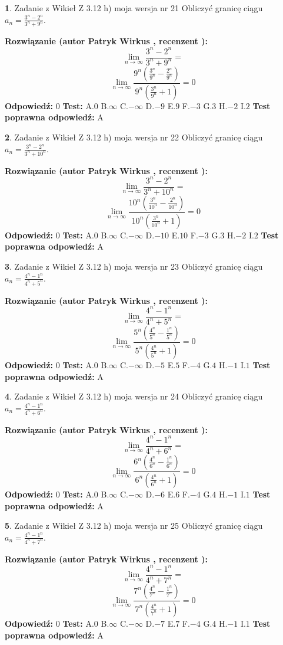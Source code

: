 \documentclass[12pt, a4paper]{article}
\theoremstyle{definition} %
\newtheorem{zad}{}
\newcommand{\zadStart}[1]{\begin{zad}#1\newline}
\newcommand{\zadStop}{\end{zad}}
\newcommand{\rozwStart}[2]{\noindent \textbf{Rozwiązanie (autor #1 , recenzent #2): }\newline}
\newcommand{\rozwStop}{\newline}
\newcommand{\odpStart}{\noindent \textbf{Odpowiedź:}\newline}
\newcommand{\odpStop}{\newline}
\newcommand{\testStart}{\noindent \textbf{Test:}\newline}
\newcommand{\testStop}{\newline}
\newcommand{\kluczStart}{\noindent \textbf{Test poprawna odpowiedź:}\newline}
\newcommand{\kluczStop}{\newline}
\begin{document}
\zadStart{Zadanie z Wikieł Z 3.12 h) moja wersja nr 21}
Obliczyć granicę ciągu $a_{n}=\frac{3^{n} - 2^{n}}{3^{n} + 9^{n}}$.
\zadStop
\rozwStart{Patryk Wirkus}{}
$$\lim\limits_{n\to\infty}\frac{3^{n} - 2^{n}}{3^{n} + 9^{n}}=$$
$$\lim\limits_{n\to\infty}\frac{9^{n}(\frac{3^{n}}{9^{n}} - \frac{2^{n}}{9^{n}})}{9^{n}(\frac{3^{n}}{9^{n}} + 1)} = 0$$
\rozwStop
\odpStart
$0$
\odpStop
\testStart
A.$0$
B.$\infty$
C.$-\infty$
D.$-9$
E.$9$
F.$-3$
G.$3$
H.$-2$
I.$2$
\testStop
\kluczStart
A
\kluczStop



\zadStart{Zadanie z Wikieł Z 3.12 h) moja wersja nr 22}
Obliczyć granicę ciągu $a_{n}=\frac{3^{n} - 2^{n}}{3^{n} + 10^{n}}$.
\zadStop
\rozwStart{Patryk Wirkus}{}
$$\lim\limits_{n\to\infty}\frac{3^{n} - 2^{n}}{3^{n} + 10^{n}}=$$
$$\lim\limits_{n\to\infty}\frac{10^{n}(\frac{3^{n}}{10^{n}} - \frac{2^{n}}{10^{n}})}{10^{n}(\frac{3^{n}}{10^{n}} + 1)} = 0$$
\rozwStop
\odpStart
$0$
\odpStop
\testStart
A.$0$
B.$\infty$
C.$-\infty$
D.$-10$
E.$10$
F.$-3$
G.$3$
H.$-2$
I.$2$
\testStop
\kluczStart
A
\kluczStop



\zadStart{Zadanie z Wikieł Z 3.12 h) moja wersja nr 23}
Obliczyć granicę ciągu $a_{n}=\frac{4^{n} - 1^{n}}{4^{n} + 5^{n}}$.
\zadStop
\rozwStart{Patryk Wirkus}{}
$$\lim\limits_{n\to\infty}\frac{4^{n} - 1^{n}}{4^{n} + 5^{n}}=$$
$$\lim\limits_{n\to\infty}\frac{5^{n}(\frac{4^{n}}{5^{n}} - \frac{1^{n}}{5^{n}})}{5^{n}(\frac{4^{n}}{5^{n}} + 1)} = 0$$
\rozwStop
\odpStart
$0$
\odpStop
\testStart
A.$0$
B.$\infty$
C.$-\infty$
D.$-5$
E.$5$
F.$-4$
G.$4$
H.$-1$
I.$1$
\testStop
\kluczStart
A
\kluczStop



\zadStart{Zadanie z Wikieł Z 3.12 h) moja wersja nr 24}
Obliczyć granicę ciągu $a_{n}=\frac{4^{n} - 1^{n}}{4^{n} + 6^{n}}$.
\zadStop
\rozwStart{Patryk Wirkus}{}
$$\lim\limits_{n\to\infty}\frac{4^{n} - 1^{n}}{4^{n} + 6^{n}}=$$
$$\lim\limits_{n\to\infty}\frac{6^{n}(\frac{4^{n}}{6^{n}} - \frac{1^{n}}{6^{n}})}{6^{n}(\frac{4^{n}}{6^{n}} + 1)} = 0$$
\rozwStop
\odpStart
$0$
\odpStop
\testStart
A.$0$
B.$\infty$
C.$-\infty$
D.$-6$
E.$6$
F.$-4$
G.$4$
H.$-1$
I.$1$
\testStop
\kluczStart
A
\kluczStop



\zadStart{Zadanie z Wikieł Z 3.12 h) moja wersja nr 25}
Obliczyć granicę ciągu $a_{n}=\frac{4^{n} - 1^{n}}{4^{n} + 7^{n}}$.
\zadStop
\rozwStart{Patryk Wirkus}{}
$$\lim\limits_{n\to\infty}\frac{4^{n} - 1^{n}}{4^{n} + 7^{n}}=$$
$$\lim\limits_{n\to\infty}\frac{7^{n}(\frac{4^{n}}{7^{n}} - \frac{1^{n}}{7^{n}})}{7^{n}(\frac{4^{n}}{7^{n}} + 1)} = 0$$
\rozwStop
\odpStart
$0$
\odpStop
\testStart
A.$0$
B.$\infty$
C.$-\infty$
D.$-7$
E.$7$
F.$-4$
G.$4$
H.$-1$
I.$1$
\testStop
\kluczStart
A
\kluczStop
\end{document}
